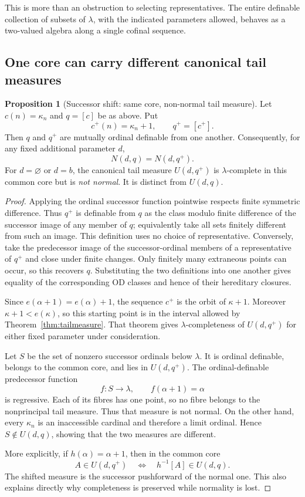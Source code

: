 \documentclass[11pt,letterpaper]{article}
\theoremstyle{definition}
\newtheorem{proposition}[definition]{Proposition}
\begin{document}
This is more than an obstruction to selecting representatives. The entire definable collection of subsets of $\lambda$, with the indicated parameters allowed, behaves as a two-valued algebra along a single cofinal sequence.

\subsection{One core can carry different canonical tail measures}\label{sec:shift}

\begin{proposition}[Successor shift: same core, non-normal tail measure]\label{prop:shift}
Let $c(n)=\kappa_n$ and $q=[c]$ be as above. Put
\[
               c^+(n)=\kappa_n+1,\qquad q^+=[c^+].
\]
Then $q$ and $q^+$ are mutually ordinal definable from one another. Consequently, for any fixed additional parameter $d$,
\[
                         N(d,q)=N(d,q^+).
\]
For $d=\varnothing$ or $d=b$, the canonical tail measure $U(d,q^+)$ is $\lambda$-complete in this common core but is \emph{not normal}. It is distinct from $U(d,q)$.
\end{proposition}

\begin{proof}
Applying the ordinal successor function pointwise respects finite symmetric difference. Thus $q^+$ is definable from $q$ as the class modulo finite difference of the successor image of any member of $q$; equivalently take all sets finitely different from such an image. This definition uses no choice of representative. Conversely, take the predecessor image of the successor-ordinal members of a representative of $q^+$ and close under finite changes. Only finitely many extraneous points can occur, so this recovers $q$. Substituting the two definitions into one another gives equality of the corresponding OD classes and hence of their hereditary closures.

Since $e(\alpha+1)=e(\alpha)+1$, the sequence $c^+$ is the orbit of $\kappa+1$. Moreover $\kappa+1<e(\kappa)$, so this starting point is in the interval allowed by Theorem~\ref{thm:tailmeasure}. That theorem gives $\lambda$-completeness of $U(d,q^+)$ for either fixed parameter under consideration.

Let $S$ be the set of nonzero successor ordinals below $\lambda$. It is ordinal definable, belongs to the common core, and lies in $U(d,q^+)$. The ordinal-definable predecessor function
\[
                            f:S\to\lambda,\qquad f(\alpha+1)=\alpha
\]
is regressive. Each of its fibres has one point, so no fibre belongs to the nonprincipal tail measure. Thus that measure is not normal. On the other hand, every $\kappa_n$ is an inaccessible cardinal and therefore a limit ordinal. Hence $S\notin U(d,q)$, showing that the two measures are different.

More explicitly, if $h(\alpha)=\alpha+1$, then in the common core
\[
                   A\in U(d,q^+)\quad\Longleftrightarrow\quad
                        h^{-1}[A]\in U(d,q).
\]
The shifted measure is the successor pushforward of the normal one. This also explains directly why completeness is preserved while normality is lost.
\end{proof}
\end{document}
